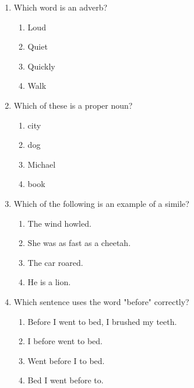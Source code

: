 \documentclass[12pt]{article}
\begin{document}
\begin{enumerate}
    \vspace{0.5cm}

    \item Which word is an adverb?

    \begin{enumerate}[label=\Alph*.]
        \item Loud
        \item Quiet
        \item Quickly
        \item Walk
    \end{enumerate}

    \vspace{0.5cm}

    \item Which of these is a proper noun?

    \begin{enumerate}[label=\Alph*.]
        \item city
        \item dog
        \item Michael
        \item book
    \end{enumerate}

    \vspace{0.5cm}

    \item Which of the following is an example of a simile?

    \begin{enumerate}[label=\Alph*.]
        \item The wind howled.
        \item She was as fast as a cheetah.
        \item The car roared.
        \item He is a lion.
    \end{enumerate}

    \vspace{0.5cm}

    \item Which sentence uses the word "before" correctly?

    \begin{enumerate}[label=\Alph*.]
        \item Before I went to bed, I brushed my teeth.
        \item I before went to bed.
        \item Went before I to bed.
        \item Bed I went before to.
    \end{enumerate}


\end{enumerate}
\end{document}
